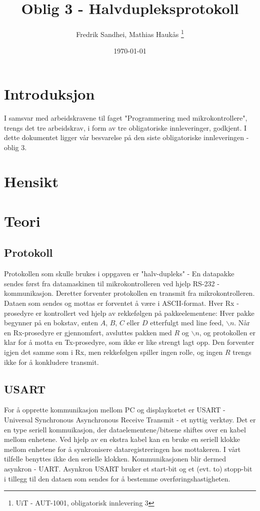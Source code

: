\documentclass[11pt, a4paper]{report}
\begin{document}
\title{Oblig 3 - Halvdupleksprotokoll}
\author{Fredrik Sandhei, Mathias Haukås \thanks{UiT - AUT-1001, obligatorisk innlevering 3}}
\date{\today}
\maketitle
\newpage
\tableofcontents
\newpage

\section{Introduksjon}
I samsvar med arbeidskravene til faget "Programmering med mikrokontrollere", trengs det tre arbeidskrav, i form av tre obligatoriske innleveringer, godkjent. I dette dokumentet ligger vår besvarelse på den siste obligatoriske innleveringen - oblig 3. 

\section{Hensikt}

\section{Teori}

\subsection{Protokoll}
Protokollen som skulle brukes i oppgaven er "halv-dupleks" - En datapakke sendes først fra datamaskinen til mikrokontrolleren ved hjelp RS-232 - kommunikasjon. Deretter forventer protokollen en transmit fra mikrokontrolleren. Dataen som sendes og mottas er forventet å være i ASCII-format. Hver Rx - prosedyre er kontrollert ved hjelp av rekkefølgen på pakkeelementene: Hver pakke begynner på en bokstav, enten $A$, $B$, $C$ eller $D$ etterfulgt med line feed, $\backslash n$. Når en Rx-prosedyre er gjennomført, avsluttes pakken med $R$ og $\backslash n$, og protokollen er klar for å motta en Tx-prosedyre, som ikke er like strengt lagt opp. Den forventer igjen det samme som i Rx, men rekkefølgen spiller ingen rolle, og ingen $R$ trengs ikke for å konkludere transmit. 

\subsection{USART}
For å opprette kommunikasjon mellom PC og displaykortet er USART - Universal Synchronous Asynchronous Receive Transmit - et nyttig verktøy. Det er en type seriell kommuikasjon, der dataelementene/bitsene shiftes over en kabel mellom enhetene. Ved hjelp av en ekstra kabel kan en bruke en seriell klokke mellom enhetene for å synkronisere dataregistreringen hos mottakeren. I vårt tilfelle benyttes ikke den serielle klokken. Kommunikasjonen blir dermed asynkron - UART. Asynkron USART bruker et start-bit og et (evt. to) stopp-bit i tillegg til den dataen som sendes for å bestemme overføringshastigheten. 
\end{document}

